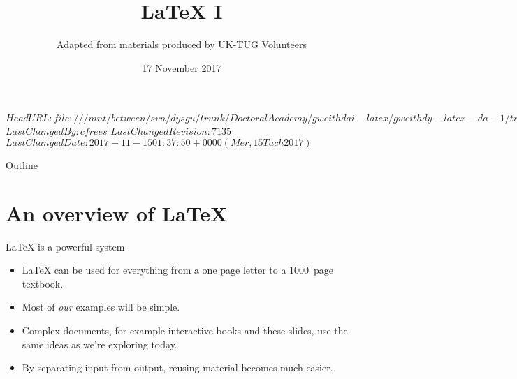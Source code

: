 \svnidlong
{$HeadURL: file:///mnt/between/svn/dysgu/trunk/DoctoralAcademy/gweithdai-latex/gweithdy-latex-da-1/training.tex $}
{$LastChangedBy: cfrees $}
{$LastChangedRevision: 7135 $}
{$LastChangedDate: 2017-11-15 01:37:50 +0000 (Mer, 15 Tach 2017) $}



\AtBeginDocument
{
  \renewcommand*{\LaTeX}{LaTeX}
  \renewcommand*{\LaTeXe}{LaTeX2e}
  \renewcommand*{\TeX}{TeX}
}

\title{\LaTeX{} I}
\subtitle{Adapted from materials produced by UK-TUG Volunteers}
\date{ 17 November 2017}




\begin{frame}
  \titlepage
\end{frame}

\maketitle


\tableofcontents

%
{
  \begin{frame}{Outline}
	\tableofcontents
  \end{frame}
}

\section{An overview of \LaTeX{}}

\begin{frame}{\LaTeX{} is a powerful system}

  \begin{itemize}
	\item \LaTeX{} can be used for everything from a one page letter to a 1000~page textbook.
	\item Most of \emph{our} examples will be simple.
	\item Complex documents, for example interactive books and these slides, use the same ideas as we're exploring today.
	\item By separating input from output, reusing material becomes much easier.
  \end{itemize}

\end{frame}

